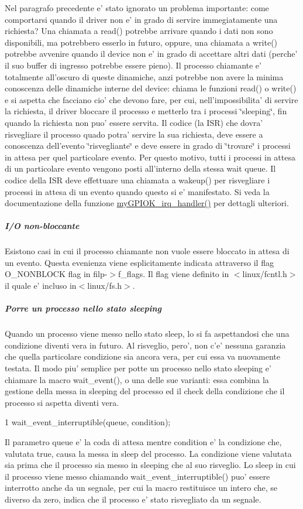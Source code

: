Nel paragrafo precedente e' stato ignorato un problema importante\+: come comportarsi quando il driver non e' in grado di servire immegiatamente una richiesta? Una chiamata a read() potrebbe arrivare quando i dati non sono disponibili, ma potrebbero esserlo in futuro, oppure, una chiamata a write() potrebbe avvenire quando il device non e' in grado di accettare altri dati (perche' il suo buffer di ingresso potrebbe essere pieno). Il processo chiamante e' totalmente all'oscuro di queste dinamiche, anzi potrebbe non avere la minima conoscenza delle dinamiche interne del device\+: chiama le funzioni read() o write() e si aspetta che facciano cio' che devono fare, per cui, nell'impossibilita' di servire la richiesta, il driver bloccare il processo e metterlo tra i processi \char`\"{}sleeping\char`\"{}, fin quando la richiesta non puo' essere servita. Il codice (la I\+S\+R) che dovra' risvegliare il processo quado potra' servire la sua richiesta, deve essere a conoscenza dell'evento \char`\"{}risvegliante\char`\"{} e deve essere in grado di \char`\"{}trovare\char`\"{} i processi in attesa per quel particolare evento. Per questo motivo, tutti i processi in attesa di un particolare evento vengono posti all'interno della stessa wait queue. Il codice della I\+S\+R deve effettuare una chiamata a wakeup() per risvegliare i processi in attesa di un evento quando questo si e' manifestato. Si veda la documentazione della funzione \hyperlink{group___linux-_driver_ga2fc230a12a97aa63e43b2dc4aec73511}{my\+G\+P\+I\+O\+K\+\_\+irq\+\_\+handler()} per dettagli ulteriori. \subparagraph*{I/\+O non-\/bloccante}

Esistono casi in cui il processo chiamante non vuole essere bloccato in attesa di un evento. Questa evenienza viene esplicitamente indicata attraverso il flag O\+\_\+\+N\+O\+N\+B\+L\+O\+C\+K flag in filp-\/$>$f\+\_\+flags. Il flag viene definito in $<$linux/fcntl.\+h$>$ il quale e' incluso in$<$linux/fs.\+h$>$.

\subparagraph*{Porre un processo nello stato sleeping}

Quando un processo viene messo nello stato sleep, lo si fa aspettandosi che una condizione diventi vera in futuro. Al risveglio, pero', non c'e' nessuna garanzia che quella particolare condizione sia ancora vera, per cui essa va nuovamente testata. Il modo piu' semplice per potte un processo nello stato sleeping e' chiamare la macro wait\+\_\+event(), o una delle sue varianti\+: essa combina la gestione della messa in sleeping del processo ed il check della condizione che il processo si aspetta diventi vera. 
\begin{DoxyCode}
1 wait\_event\_interruptible(queue, condition);
\end{DoxyCode}
 Il parametro queue e' la coda di attesa mentre condition e' la condizione che, valutata true, causa la messa in sleep del processo. La condizione viene valutata sia prima che il processo sia messo in sleeping che al suo risveglio. Lo sleep in cui il processo viene messo chiamando wait\+\_\+event\+\_\+interruptible() puo' essere interrotto anche da un segnale, per cui la macro restituisce un intero che, se diverso da zero, indica che il processo e' stato risvegliato da un segnale.

